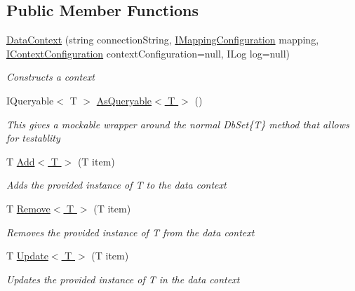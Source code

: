 \subsection*{Public Member Functions}
\begin{DoxyCompactItemize}
\item 
\hyperlink{class_highway_1_1_data_1_1_data_context_a53dda69cf93cec7079609b39ba8b6c40}{Data\-Context} (string connection\-String, \hyperlink{interface_highway_1_1_data_1_1_i_mapping_configuration}{I\-Mapping\-Configuration} mapping, \hyperlink{interface_highway_1_1_data_1_1_i_context_configuration}{I\-Context\-Configuration} context\-Configuration=null, I\-Log log=null)
\begin{DoxyCompactList}\small\item\em Constructs a context \end{DoxyCompactList}\item 
I\-Queryable$<$ T $>$ \hyperlink{class_highway_1_1_data_1_1_data_context_a3d30713ba0399753b504537e7037f679}{As\-Queryable$<$ T $>$} ()
\begin{DoxyCompactList}\small\item\em This gives a mockable wrapper around the normal Db\-Set\{\-T\} method that allows for testablity \end{DoxyCompactList}\item 
T \hyperlink{class_highway_1_1_data_1_1_data_context_aa25d7d4463901329f19e303c925ec3d6}{Add$<$ T $>$} (T item)
\begin{DoxyCompactList}\small\item\em Adds the provided instance of {\itshape T}  to the data context \end{DoxyCompactList}\item 
T \hyperlink{class_highway_1_1_data_1_1_data_context_a17ff1673fd0d79f6637e32748f38c9b5}{Remove$<$ T $>$} (T item)
\begin{DoxyCompactList}\small\item\em Removes the provided instance of {\itshape T}  from the data context \end{DoxyCompactList}\item 
T \hyperlink{class_highway_1_1_data_1_1_data_context_a90f58f01c6c3d9043cea8b911dccd913}{Update$<$ T $>$} (T item)
\begin{DoxyCompactList}\small\item\em Updates the provided instance of {\itshape T}  in the data context \end{DoxyCompactList}\item 

\end{DoxyCompactItemize}
